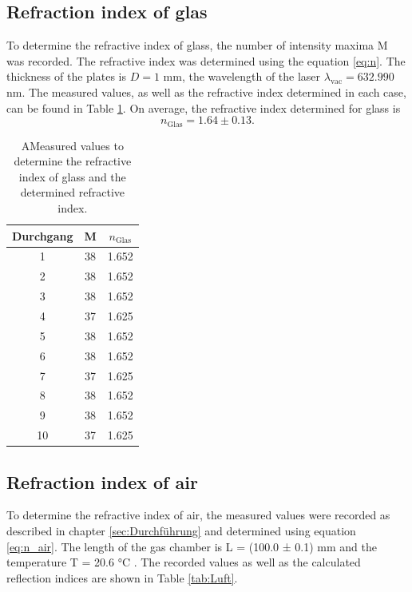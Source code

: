 \subsection{Refraction index of glas}
\label{sec:glas}

To determine the refractive index of glass, the number of intensity maxima M was recorded.
The refractive index was determined using the equation \eqref{eq:n}. 
The thickness of the plates is $D = 1$ mm, the wavelength of the laser  $\lambda_{\text{vac}} = 632.990$ nm. %
The measured values, as well as the refractive index determined in each case, can be found in Table \ref{tab:Glas}.
On average, the refractive index determined for glass is
\begin{equation*}
  n_{\text{Glas}} = 1.64 \pm 0.13.
\end{equation*}

\begin{table}[H]
  \centering
  \caption{AMeasured values to determine the refractive index of glass and the determined refractive index.}
  \label{tab:Glas}
  \begin{tabular}{c c c}
    \toprule
    Durchgang & M & $n_\text{Glas}$ \\
    \midrule
    1    &  38  & 1.652 \\
    2    &  38  & 1.652 \\   
    3    &  38  & 1.652 \\   
    4    &  37  & 1.625 \\   
    5    &  38  & 1.652 \\   
    6    &  38  & 1.652 \\   
    7    &  37  & 1.625 \\   
    8    &  38  & 1.652 \\   
    9    &  38  & 1.652 \\   
    10   &  37  & 1.625 \\   
    \bottomrule
  \end{tabular}
\end{table}


\subsection{Refraction index of air}
\label{sec:air}

To determine the refractive index of air, the measured values were recorded as described in chapter \autoref{sec:Durchführung} and determined using equation \eqref{eq:n_air}.
The length of the gas chamber is L = (100.0 ± 0.1) mm and the temperature T = 20.6 °C .
The recorded values as well as the calculated reflection indices are shown in Table \ref{tab:Luft}.

